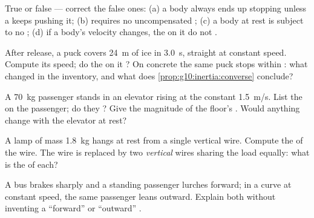 \begin{exercise}[$\star$]\label{exo:g10:inertia:5}
True or false --- correct the false ones: (a) a body always ends up
stopping unless a  keeps pushing it; (b) 
requires no uncompensated ; (c) a body at rest is subject to no
; (d) if a body's velocity changes, the  on it do not
.
\end{exercise}

\begin{exercise}[$\star\star$]\label{exo:g10:inertia:6}
After release, a puck covers \qty{24}{m} of ice in \qty{3.0}{s},
straight at constant speed. Compute its speed; do the  on it
? On concrete the same puck stops within : what changed
in the inventory, and what does \cref{prop:g10:inertia:converse}
conclude?
\end{exercise}

\begin{exercise}[$\star\star$]\label{exo:g10:inertia:7}
A \qty{70}{kg} passenger stands in an elevator rising at the constant
\qty{1.5}{m/s}. List the  on the passenger; do they ?
Give the magnitude of the floor's . Would anything change with
the elevator at rest?
\end{exercise}

\begin{exercise}[$\star\star$]\label{exo:g10:inertia:8}
A lamp of mass \qty{1.8}{kg} hangs at rest from a single vertical wire.
Compute the  of the wire. The wire is replaced by two
\emph{vertical} wires sharing the load equally: what is the  of
each?
\end{exercise}

\begin{exercise}[$\star\star$]\label{exo:g10:inertia:9}
A bus brakes sharply and a standing passenger lurches forward; in a
curve at constant speed, the same passenger leans outward. Explain
both without inventing a ``forward'' or ``outward'' .
\end{exercise}

